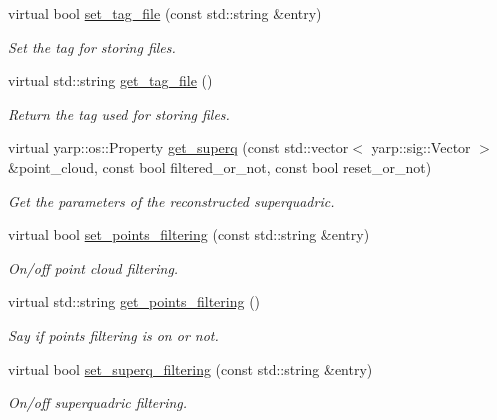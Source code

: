 \begin{DoxyCompactItemize}
\item 
virtual bool \hyperlink{classsuperquadricModel__IDL_a781426bfc4862e87ef75a4bbbfa33275}{set\-\_\-tag\-\_\-file} (const std\-::string \&entry)
\begin{DoxyCompactList}\small\item\em Set the tag for storing files. \end{DoxyCompactList}\item 
virtual std\-::string \hyperlink{classsuperquadricModel__IDL_a6d39eaa247aec65fe2bfefbdace4ec85}{get\-\_\-tag\-\_\-file} ()
\begin{DoxyCompactList}\small\item\em Return the tag used for storing files. \end{DoxyCompactList}\item 
virtual yarp\-::os\-::\-Property \hyperlink{classsuperquadricModel__IDL_a10039bb93445066d9dd29d8f6c9ef6c5}{get\-\_\-superq} (const std\-::vector$<$ yarp\-::sig\-::\-Vector $>$ \&point\-\_\-cloud, const bool filtered\-\_\-or\-\_\-not, const bool reset\-\_\-or\-\_\-not)
\begin{DoxyCompactList}\small\item\em Get the parameters of the reconstructed superquadric. \end{DoxyCompactList}\item 
virtual bool \hyperlink{classsuperquadricModel__IDL_a1a2080d797a81b46b0dffa86b5367e15}{set\-\_\-points\-\_\-filtering} (const std\-::string \&entry)
\begin{DoxyCompactList}\small\item\em On/off point cloud filtering. \end{DoxyCompactList}\item 
virtual std\-::string \hyperlink{classsuperquadricModel__IDL_aa490ebcf39414aaaae41d5095267abb9}{get\-\_\-points\-\_\-filtering} ()
\begin{DoxyCompactList}\small\item\em Say if points filtering is on or not. \end{DoxyCompactList}\item 
virtual bool \hyperlink{classsuperquadricModel__IDL_af418edf09afd9374c5272d018c58e8a7}{set\-\_\-superq\-\_\-filtering} (const std\-::string \&entry)
\begin{DoxyCompactList}\small\item\em On/off superquadric filtering. \end{DoxyCompactList}\item 

\end{DoxyCompactItemize}

